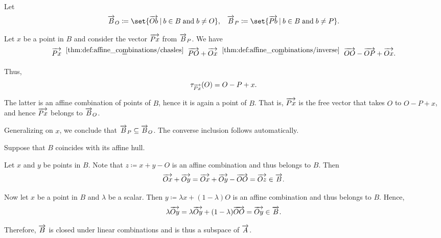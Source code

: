 \begin{defproof}
   Let
  \begin{align*}
    \vect B_O \coloneqq \set{ \vect{Ob} \given b \in B \T{and} b \neq O },
    &&
    \vect B_P \coloneqq \set{ \vect{Pb} \given b \in B \T{and} b \neq P }.
  \end{align*}

  Let \( x \) be a point in \( B \) and consider the vector \( \overrightarrow{P x} \) from \( \overrightarrow{B}_P \). We have
  \begin{equation*}
    \vect{P x}
    \reloset {\ref{thm:def:affine_combinations/chasles}} =
    \vect{PO} + \vect{O x}
    \reloset {\ref{thm:def:affine_combinations/inverse}} =
    \vect{OO} - \vect{OP} + \vect{O x}.
  \end{equation*}

  Thus,
  \begin{equation*}
    \tau_{\overrightarrow{Px}}(O) = O - P + x.
  \end{equation*}

  The latter is an affine combination of points of \( B \), hence it is again a point of \( B \). That is, \( \overrightarrow{Px} \) is the free vector that takes \( O \) to \( O - P + x \), and hence \( \overrightarrow{Px} \) belongs to \( \overrightarrow{B}_O \).

  Generalizing on \( x \), we conclude that \( \overrightarrow{B}_P \subseteq \overrightarrow{B}_O \). The converse inclusion follows automatically.

   Suppose that \( B \) coincides with its affine hull.

  Let \( x \) and \( y \) be points in \( B \). Note that \( z \coloneqq x + y - O \) is an affine combination and thus belongs to \( B \). Then
  \begin{equation*}
    \overrightarrow{Ox} + \overrightarrow{Oy}
    =
    \overrightarrow{Ox} + \overrightarrow{Oy} - \overrightarrow{OO}
    =
    \overrightarrow{Oz}
    \in
    \overrightarrow{B}.
  \end{equation*}

  Now let \( x \) be a point in \( B \) and \( \lambda \) be a scalar. Then \( y \coloneqq \lambda x + (1 - \lambda) O \) is an affine combination and thus belongs to \( B \). Hence,
  \begin{equation*}
    \lambda \overrightarrow{Oy}
    =
    \lambda \overrightarrow{Oy} + (1 - \lambda) \overrightarrow{OO}
    =
    \overrightarrow{Oy}
    \in
    \overrightarrow{B}.
  \end{equation*}

  Therefore, \( \overrightarrow{B} \) is closed under linear combinations and is thus a subspace of \( \overrightarrow{A} \).


\end{defproof}
